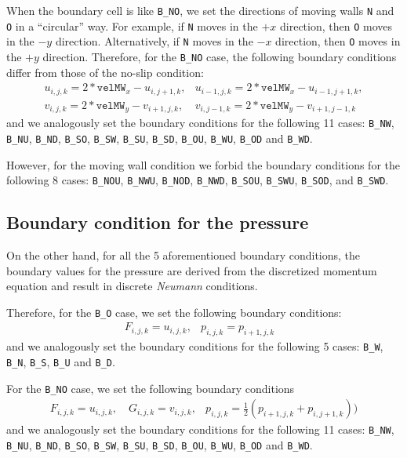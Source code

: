 \documentclass[a4paper, 12pt]{article}
\begin{document}
When the boundary cell is like \texttt{B\_NO}, we set the directions of moving walls \texttt{N} and \texttt{O} in a ``circular'' way. For example, if \texttt{N} moves in the $+x$ direction, then \texttt{O} moves in the $-y$ direction. Alternatively, if \texttt{N} moves in the $-x$ direction, then \texttt{O} moves in the $+y$ direction. Therefore, for the \texttt{B\_NO} case, the following boundary conditions differ from those of the no-slip condition:
\begin{equation}
\begin{array}{ll}
u_{i,j,k} = 2*\texttt{velMW}_x-u_{i,j+1,k}, & u_{i-1,j,k} = 2*\texttt{velMW}_x-u_{i-1,j+1,k}, \\
v_{i,j,k} = 2*\texttt{velMW}_y-v_{i+1,j,k}, & v_{i,j-1,k} = 2*\texttt{velMW}_y-v_{i+1,j-1,k}
\end{array}
\end{equation}
and we analogously set the boundary conditions for the following 11 cases: \texttt{B\_NW}, \texttt{B\_NU}, \texttt{B\_ND}, \texttt{B\_SO}, \texttt{B\_SW}, \texttt{B\_SU}, \texttt{B\_SD}, \texttt{B\_OU}, \texttt{B\_WU}, \texttt{B\_OD} and \texttt{B\_WD}.

However, for the moving wall condition we forbid the boundary conditions for the following 8 cases: \texttt{B\_NOU}, \texttt{B\_NWU}, \texttt{B\_NOD}, \texttt{B\_NWD}, \texttt{B\_SOU}, \texttt{B\_SWU}, \texttt{B\_SOD}, and \texttt{B\_SWD}.

\subsection{Boundary condition for the pressure}
On the other hand, for all the 5 aforementioned boundary conditions, the boundary values for the pressure are derived from the discretized momentum equation and result in discrete \textit{Neumann} conditions.

Therefore, for the \texttt{B\_O} case, we set the following boundary conditions:
\begin{equation}
\begin{array}{lll}
F_{i,j,k} = u_{i,j,k}, & p_{i,j,k} = p_{i+1,j,k} &
\end{array}
\end{equation}
and we analogously set the boundary conditions for the following 5 cases: \texttt{B\_W}, \texttt{B\_N}, \texttt{B\_S}, \texttt{B\_U} and \texttt{B\_D}.

For the \texttt{B\_NO} case, we set the following boundary conditions
\begin{equation}
\begin{array}{ll}
F_{i,j,k} = u_{i,j,k}, \quad G_{i,j,k} = v_{i,j,k},
& p_{i,j,k} = \frac{1}{2}(p_{i+1,j,k}+p_{i,j+1,k}))
\end{array}
\end{equation}
and we analogously set the boundary conditions for the following 11 cases: \texttt{B\_NW}, \texttt{B\_NU}, \texttt{B\_ND}, \texttt{B\_SO}, \texttt{B\_SW}, \texttt{B\_SU}, \texttt{B\_SD}, \texttt{B\_OU}, \texttt{B\_WU}, \texttt{B\_OD} and \texttt{B\_WD}.
\end{document}
